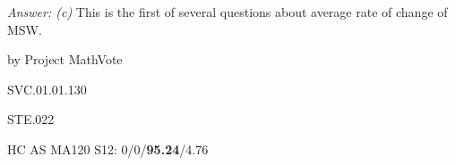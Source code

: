 {\it Answer:  (c)}  This is the first of several questions about average rate of change of MSW.

\medskip
by Project MathVote

SVC.01.01.130

STE.022

HC AS MA120 S12: 0/0/{\bf95.24}/4.76  \\
